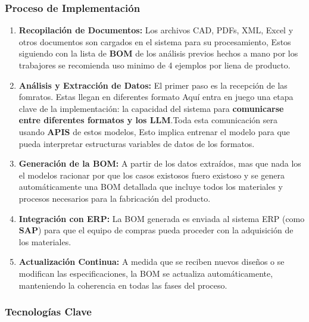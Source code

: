 \documentclass[
  10pt,
  letterpaper,
]{book}
\providecommand{\tightlist}{%
  \setlength{\itemsep}{0pt}\setlength{\parskip}{0pt}}\usepackage{longtable,booktabs,array}
\begin{document}
\subsubsection{Proceso de
Implementación}\label{proceso-de-implementaciuxf3n}

\begin{enumerate}
\def\labelenumi{\arabic{enumi}.}
\tightlist
\item
  \textbf{Recopilación de Documentos:} Los archivos CAD, PDFs, XML,
  Excel y otros documentos son cargados en el sistema para su
  procesamiento, Estos siguiendo con la lista de \textbf{BOM} de los
  análisis previos hechos a mano por los trabajores se recomienda uso
  minimo de 4 ejemplos por liena de producto.
\item
  \textbf{Análisis y Extracción de Datos:} El primer paso es la
  recepción de las fomratos. Estas llegan en diferentes formato Aquí
  entra en juego una etapa clave de la implementación: la capacidad del
  sistema para \textbf{comunicarse entre diferentes formatos y los
  LLM}.Toda esta comunicación sera usando \textbf{APIS} de estos
  modelos, Esto implica entrenar el modelo para que pueda interpretar
  estructuras variables de datos de los formatos.
\item
  \textbf{Generación de la BOM:} A partir de los datos extraídos, mas
  que nada los el modelos racionar por que los casos existosos fuero
  existoso y se genera automáticamente una BOM detallada que incluye
  todos los materiales y procesos necesarios para la fabricación del
  producto.
\item
  \textbf{Integración con ERP:} La BOM generada es enviada al sistema
  ERP (como \textbf{SAP}) para que el equipo de compras pueda proceder
  con la adquisición de los materiales.
\item
  \textbf{Actualización Continua:} A medida que se reciben nuevos
  diseños o se modifican las especificaciones, la BOM se actualiza
  automáticamente, manteniendo la coherencia en todas las fases del
  proceso.
\end{enumerate}

\subsubsection{Tecnologías Clave}\label{tecnologuxedas-clave}
\end{document}
